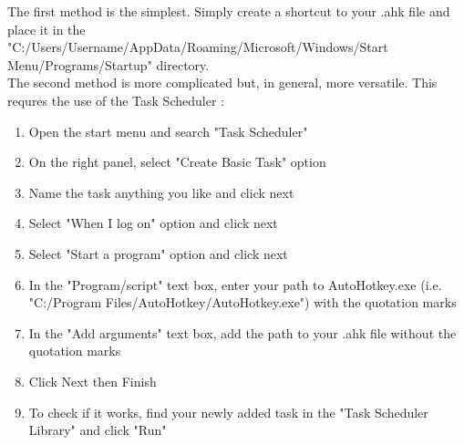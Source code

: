 The first method is the simplest. Simply create a shortcut to your .ahk file
and place it in the\\
"C:/Users/Username/AppData/Roaming/Microsoft/Windows/Start
Menu/Programs/Startup" directory.\\

The second method is more complicated but, in general, more versatile. This
requres the use of the Task Scheduler \cite{bashkarla2016how}:
\begin{enumerate}
    \item Open the start menu and search "Task Scheduler"
    \item On the right panel, select "Create Basic Task" option
    \item Name the task anything you like and click next
    \item Select "When I log on" option and click next
    \item Select "Start a program" option and click next
    \item In the "Program/script" text box, enter your path to AutoHotkey.exe
        (i.e. "C:/Program Files/AutoHotkey/AutoHotkey.exe") with the quotation marks
    \item In the "Add arguments" text box, add the path to your .ahk file
        without the quotation marks
    \item Click Next then Finish
    \item To check if it works, find your newly added task in the "Task Scheduler Library" and
       click "Run"
\end{enumerate}

